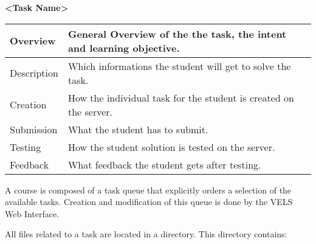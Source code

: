 \begin{description}




    \item \textbf{<Task Name>}\\
    \begin{tabular}{|p{2cm}|p{11cm}|}
        \hline
        Overview & General Overview of the the task, the intent and learning objective.
        \\
        \hline
        Description & Which informations the student will get to solve the task. 
        \\
        \hline
        Creation & How the individual task for the student is created on the server.  
        \\
        \hline
        Submission & What the student has to submit.
        \\
        \hline
        Testing & How the student solution is tested on the server.
        \\
        \hline
        Feedback & What feedback the student gets after testing.
        \\
        \hline 
    \end{tabular}
\end{description}

A course is composed of a task queue that explicitly orders a selection of the available tasks. Creation
and modification of this queue is done by the VELS Web Interface.


\newpage

All files related to a task are located in a directory. This directory contains:
    
